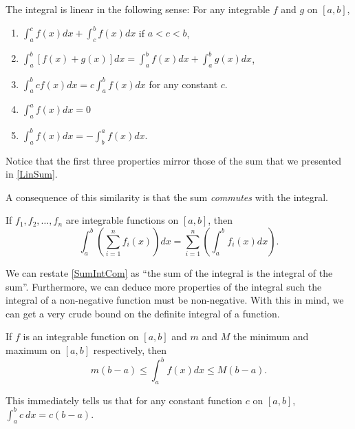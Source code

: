 \begin{lem}
The integral is linear in the following sense: For any integrable $f$ and $g$ on $[a,b]$,
\begin{enumerate}
  \item $\int_{a}^{c}f(x)dx+\int_{c}^{b}f(x)dx$ if $a<c<b$,
  \item $\int_{a}^{b}[f(x)+g(x)]dx=\int_{a}^{b}f(x)dx+\int_{a}^{b}g(x)dx$,
  \item $\int_{a}^{b}c f(x)dx=c\int_{a}^{b}f(x)dx$ for any constant $c$.
  \item $\int_{a}^af(x)dx=0$
  \item $\int_{a}^{b}f(x)dx=-\int_{b}^{a}f(x)dx$.
\end{enumerate}
\end{lem}
\begin{rem}
  Notice that the first three properties mirror those of the sum that we presented in \cref{LinSum}.
\end{rem}
A consequence of this similarity is that the sum \emph{commutes} with the integral.
\begin{cor}\label{SumIntCom}
  If $f_1, f_2, \dotsc, f_n$ are integrable functions on $[a,b]$, then
  \begin{equation}
    \int_{a}^{b}\left(\sum_{i=1}^{n}f_i(x) \right)dx= \sum_{i=1}^{n}\left(\int_{a}^{b}f_{i}(x)dx\right).
  \end{equation}
\end{cor}
We can restate \cref{SumIntCom} as ``the sum of the integral is the integral of the sum''. Furthermore, we can deduce more properties of the integral  such the integral of a non-negative function must be non-negative. With this in mind, we can get a very crude bound on the definite integral of a function.


\begin{prop}
  If $f$ is an integrable function on $[a,b]$ and $m$ and $M$ the minimum and maximum on $[a,b]$ respectively, then
  \begin{equation}
    m(b-a)\leq \int_{a}^{b} f(x)dx\leq M(b-a).
  \end{equation}
\end{prop}
\begin{rem}\label{ConstInt}
  This immediately tells us that for any constant function $c$ on $[a,b]$, $\int_{a}^{b} c\ dx=c(b-a)$.
\end{rem}
